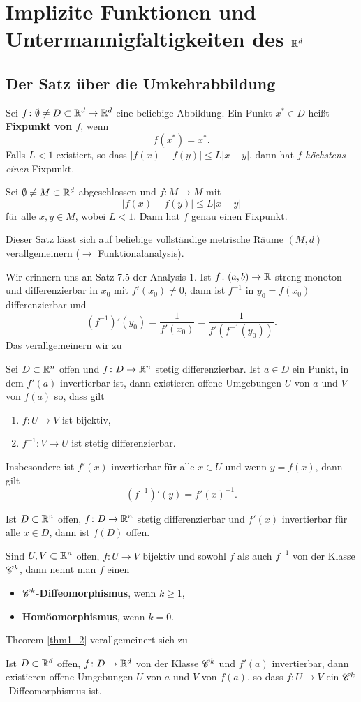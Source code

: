 \section{Implizite Funktionen und Untermannigfaltigkeiten des $\mathbb{R}^d$}
\subsection{Der Satz über die Umkehrabbildung}
Sei $f \colon \emptyset \neq D \subset \mathbb{R}^d \to \mathbb{R}^d$ eine beliebige Abbildung. Ein Punkt $x^* \in D$ heißt \textbf{Fixpunkt von $f$}, wenn 
\[f(x^*) = x^*.\]
Falls $L<1$ existiert, so dass $|f(x) - f(y)| \leq L |x-y|$, dann hat $f$ \textit{höchstens einen} Fixpunkt.

\begin{satz}\label{satz1_1}
	Sei $\emptyset \neq M \subset \mathbb{R}^d$ abgeschlossen und $f \colon M \to M$ mit 
	\[|f(x) - f(y)| \leq L |x-y|\]
	für alle $x,y \in M$, wobei $L < 1$. Dann hat $f$ genau einen Fixpunkt.
\end{satz}
Dieser Satz lässt sich auf beliebige vollständige metrische Räume $(M, d)$ verallgemeinern ($\to$ Funktionalanalysis).

Wir erinnern uns an Satz 7.5 der Analysis 1. Ist $f \colon (a,b) \to \mathbb{R}$ streng monoton und differenzierbar in $x_0$ mit $f'(x_0) \neq 0$, dann ist $f^{-1}$ in $y_0 = f(x_0)$ differenzierbar und
\[(f^{-1})'(y_0) = \frac{1}{f'(x_0)} = \frac{1}{f'(f^{-1}(y_0))}.\]
Das verallgemeinern wir zu
\begin{thm}\label{thm1_2}
	Sei $D \subset \mathbb{R}^n$ offen und $f \colon D \to \mathbb{R}^n$ stetig differenzierbar. Ist $a \in D$ ein Punkt, in dem $f'(a)$ invertierbar ist, dann existieren offene Umgebungen $U$ von $a$ und $V$ von $f(a)$ so, dass gilt
	\begin{enumerate}[label=(\alph*)]
		\item $f \colon U \to V$ ist bijektiv,
		\item $f^{-1} \colon V \to U$ ist stetig differenzierbar.
	\end{enumerate}
	Insbesondere ist $f'(x)$ invertierbar für alle $x \in U$ und wenn $y = f(x)$, dann gilt
	\[(f^{-1})'(y) = f'(x)^{-1}.\]
\end{thm}
\begin{kor}\label{kor1_3}
	Ist $D \subset \mathbb{R}^n$ offen, $f \colon D \to \mathbb{R}^n$ stetig differenzierbar und $f'(x)$ invertierbar für alle $x \in D$, dann ist $f(D)$ offen.
\end{kor}
Sind $U, V \subset \mathbb{R}^n$ offen, $f \colon U \to V$ bijektiv und sowohl $f$ als auch $f^{-1}$ von der Klasse $\mathscr{C}^k$, dann nennt man $f$ einen
\begin{itemize}
	\item $\mathscr{C}^k$-\textbf{Diffeomorphismus}, wenn $k \geq 1$,
	\item \textbf{Homöomorphismus}, wenn $k=0$.
\end{itemize}
Theorem \ref{thm1_2} verallgemeinert sich zu
\begin{thm}\label{thm1_4}
	Ist $D \subset \mathbb{R}^d$ offen, $f \colon D \to \mathbb{R}^d$ von der Klasse $\mathscr{C}^k$ und $f'(a)$ invertierbar, dann existieren offene Umgebungen $U$ von $a$ und $V$ von $f(a)$, so dass $f \colon U \to V$ ein $\mathscr{C}^k$-Diffeomorphismus ist.
\end{thm}
